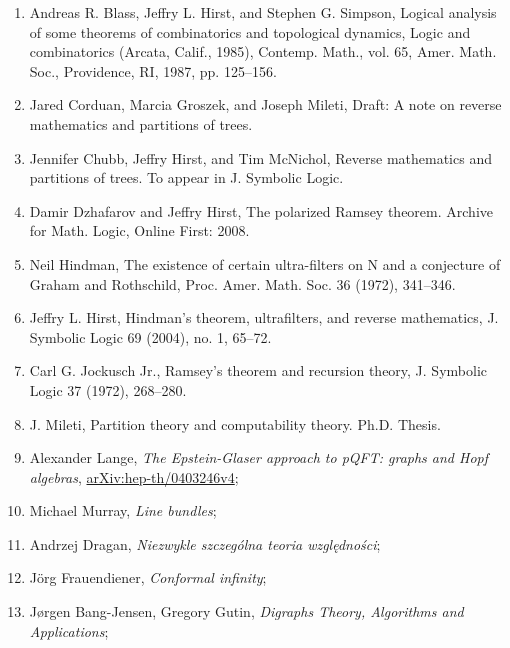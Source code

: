 \documentclass[a4paper,11pt]{article}
\begin{document}
\begin{enumerate}
\item Andreas R. Blass, Jeffry L. Hirst, and Stephen G. Simpson,
  Logical analysis of some theorems of combinatorics and topological
  dynamics, Logic and combinatorics (Arcata, Calif., 1985), Contemp.
  Math., vol. 65, Amer. Math. Soc., Providence, RI, 1987, pp. 125–156.

\item Jared Corduan, Marcia Groszek, and Joseph Mileti, Draft: A note
  on reverse mathematics and partitions of trees.

\item Jennifer Chubb, Jeffry Hirst, and Tim McNichol, Reverse
  mathematics and partitions of trees. To appear in J. Symbolic Logic.

\item Damir Dzhafarov and Jeffry Hirst, The polarized Ramsey theorem.
  Archive for Math. Logic, Online First: 2008.

\item Neil Hindman, The existence of certain ultra-filters on N and a
  conjecture of Graham and Rothschild, Proc. Amer. Math. Soc. 36
  (1972), 341–346.

\item Jeffry L. Hirst, Hindman’s theorem, ultrafilters, and reverse
  mathematics, J. Symbolic Logic 69 (2004), no. 1, 65–72.

\item Carl G. Jockusch Jr., Ramsey’s theorem and recursion theory, J.
  Symbolic Logic 37 (1972), 268–280.

\item J. Mileti, Partition theory and computability theory. Ph.D.
  Thesis.

\item Alexander Lange, \textit{The Epstein-Glaser approach to pQFT:
    graphs and Hopf algebras},
  \href{https://arxiv.org/abs/hep-th/0403246v4}{arXiv:hep-th/0403246v4};

\item Michael Murray, \textit{Line bundles};

\item Andrzej Dragan, \textit{Niezwykle szczególna teoria
    względności};

\item J\"{o}rg Frauendiener, \textit{Conformal infinity};

\item J\o rgen Bang-Jensen, Gregory Gutin, \textit{Digraphs Theory,
    Algorithms and Applications};


\end{enumerate}
\end{document}
